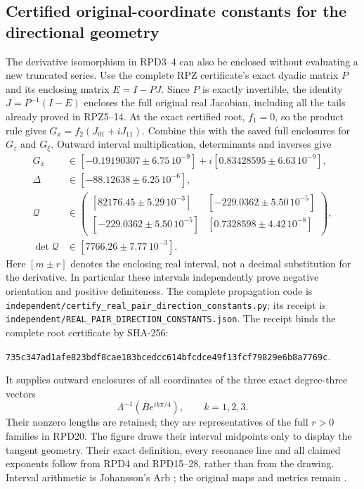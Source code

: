 \documentclass[11pt]{article}
\begin{document}
\subsection{Certified original-coordinate constants for the directional geometry}
The derivative isomorphism in RPD3--4 can also be enclosed without
evaluating a new truncated series.  Use the complete RPZ certificate's
exact dyadic matrix $P$ and its enclosing matrix $E=I-PJ$.  Since $P$
is exactly invertible, the identity $J=P^{-1}(I-E)$ encloses the full
original real Jacobian, including all the tails already proved in
RPZ5--14.  At the exact certified root, $f_1=0$, so the product rule
gives $G_x=f_2(J_{01}+iJ_{11})$.  Combine this with the saved full
enclosures for $G_z$ and $G_\xi$.  Outward interval multiplication,
determinants and inverses give
\[
\begin{aligned}
 G_x&\in[-0.19190307\pm6.75\,10^{-9}]
              +i[0.83428595\pm6.63\,10^{-9}],\\
 \Delta&\in[-88.12638\pm6.25\,10^{-6}],\\
 \mathcal Q&\in
 \begin{pmatrix}
 [82176.45\pm5.29\,10^{-3}]&[-229.0362\pm5.50\,10^{-5}]\\
 [-229.0362\pm5.50\,10^{-5}]&[0.7328598\pm4.42\,10^{-8}]
 \end{pmatrix},\\
 \det\mathcal Q&\in[7766.26\pm7.77\,10^{-3}].
\end{aligned}\tag{RPD31}
\]
Here $[m\pm r]$ denotes the enclosing real interval, not a decimal
substitution for the derivative.  In particular these intervals
independently prove negative orientation and positive definiteness.
The complete propagation code is
\nolinkurl{independent/certify_real_pair_direction_constants.py};
its receipt is \nolinkurl{independent/REAL_PAIR_DIRECTION_CONSTANTS.json}.
The receipt binds the complete root certificate by SHA-256:
\par\noindent
\texttt{735c347ad1afe823bdf8cae183bcedcc614bfcdce49f13fcf79829e6b8a7769c}.
\par
It supplies outward enclosures of all coordinates of the three exact
degree-three vectors
\[
\Lambda^{-1}(B e^{ik\pi/4}),\qquad k=1,2,3.
\]
Their nonzero lengths are retained; they are representatives of
the full $r>0$ families in RPD20.  The figure draws their interval
midpoints only to display the tangent geometry.  Their exact
definition, every resonance line and all claimed exponents follow
from RPD4 and RPD15--28, rather than from the drawing.
Interval arithmetic is Johansson's Arb \cite{human:arb2016}; the
original maps and metrics remain \cite{PCLOriginal,WCF}.
\end{document}
